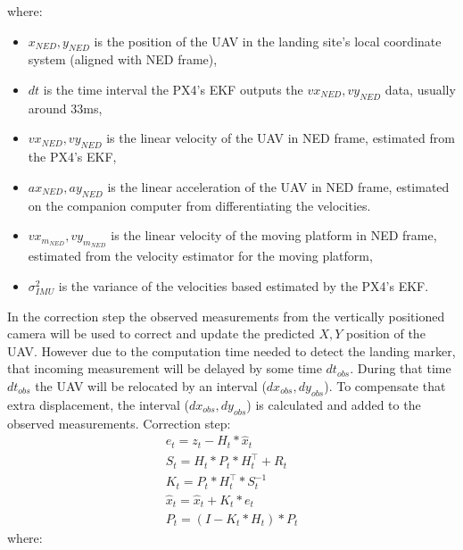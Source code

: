 \documentclass[conference]{IEEEtran}
\begin{document}
where:
\begin{itemize}

\item  \(x_{NED}, y_{NED} \) is the position of the UAV in the landing site's local coordinate system (aligned with NED frame), 
\item \(dt\) is the time interval the PX4's EKF outputs the \(vx_{NED},vy_{NED}\) data, usually around 33ms, 
\item \(vx_{NED},vy_{NED}\) is the linear velocity of the UAV in NED frame, estimated from the PX4's EKF,
\item \(ax_{NED}, ay_{NED}\) is the linear acceleration of the UAV in NED frame, estimated on the companion computer from differentiating the velocities.
\item \(vx_{m_{NED}},vy_{m_{NED}}\) is the linear velocity of the moving platform in NED frame, estimated from the velocity estimator for the moving platform,
\item \(\sigma^{2}_{IMU}\) is the variance of the velocities based estimated by the PX4's EKF.
\end{itemize}

In the correction step the observed measurements from the vertically positioned camera will be used to correct and update the predicted \(X,Y\) position of the UAV. However due to the computation time needed to detect the landing marker, that incoming measurement will be delayed by some time \(dt_{obs}\). During that time \(dt_{obs}\) the UAV will be relocated by an interval (\(dx_{obs},dy_{obs}\)). To compensate that extra displacement, the  interval (\(dx_{obs},dy_{obs}\)) is calculated and added to the observed measurements.
Correction step:
\begin{equation}
    \begin{array}{l}
    
    e_{t} = z_{t} - H_{t}*\hat{x}_{t} \\
    S_{t} = H_{t}*P_{t}*H_{t}^\top + R_{t} \\
    K_{t} = P_{t}*H_{t}^\top * S_{t}^{-1} \\
    \hat{x}_{t} = \hat{x}_{t} + K_{t} * e_{t} \\
    P_{t} = (I - K_{t}*H_{t}) * P_{t}
    \end{array}
\end{equation}
where:
\end{document}
